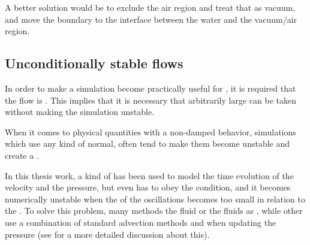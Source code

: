 A better solution would be to exclude the air region and treat that as vacuum, and move the boundary to the interface between the water and the vacuum/air region.

\subsection{Unconditionally stable flows}

In order to make a \FVM simulation become practically useful for , it is required that the flow is . This implies that it is necessary that arbitrarily large \timesteps can be taken without making the simulation unstable.

When it comes to physical quantities with a non-damped \oscillating behavior, simulations which use any kind of normal,  often tend to make them become unstable and create a .

In this thesis work, a kind of  has been used to model the time evolution of the velocity and the pressure, but even  has to obey the \CFL condition, and it becomes numerically unstable when the \period of the oscillations becomes too small in relation to the \timestep. To solve this problem, many methods \approximate the fluid or the fluids as \incompressible, while other use a combination of standard advection methods and  when updating the pressure (see  for a more detailed discussion about this).


